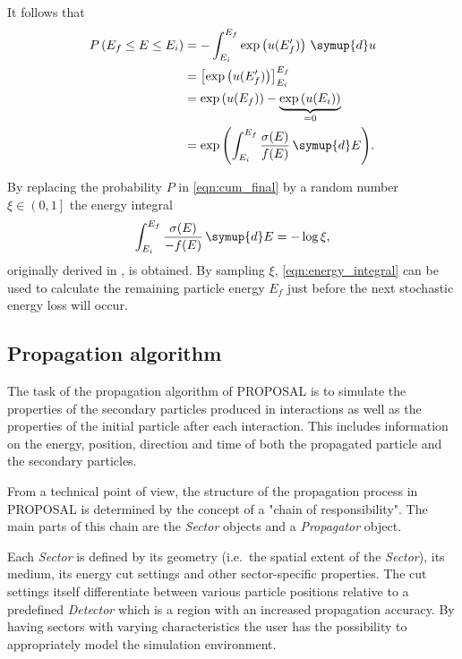 It follows that
%
\begin{equation}
	\label{eqn:cum_final}
	\begin{split}
	P\left(E_f \leq E \leq E_i\right) &= - \int_{E_i}^{E_f} \exp \left( u(E_f') \right) \, \symup{d}u \\
	&= \left[ \exp \left( u(E'_f) \right) \right]_{E_i}^{E_f}\\
	&= \exp\left( u(E_f) \right) - \underbrace{\exp \left( u(E_i) \right)}_{= 0} \\
	&= \exp{\left( \int_{E_i}^{E_f} \frac{\sigma(E)}{f(E)} \, \symup{d}E \right)}.
	\end{split}
\end{equation}

By replacing the probability $P$ in \eqref{eqn:cum_final} by a random number $\xi \in \left(0, 1\right]$ the energy integral
%
\begin{equation}
	\label{eqn:energy_integral}
	\int_{E_i}^{E_f} \frac{\sigma(E)}{-f(E)} \, \symup{d}E = - \log{\xi},
\end{equation}
%
originally derived in \cite{chirkin2004propagating}, is obtained. 
By sampling $\xi$, \eqref{eqn:energy_integral} can be used to calculate the remaining particle energy $E_f$ just before the next stochastic energy loss will occur.

\subsection{Propagation algorithm}
\label{sec:algorithm}

The task of the propagation algorithm of PROPOSAL is to simulate the properties of the secondary particles produced in interactions as well as the properties of the initial particle after each interaction.
This includes information on the energy, position, direction and time of both the propagated particle and the secondary particles.

From a technical point of view, the structure of the propagation process in PROPOSAL is determined by the concept of a "chain of responsibility".
The main parts of this chain are the \emph{Sector} objects and a \emph{Propagator} object.

Each \emph{Sector} is defined by its geometry (i.e.\ the spatial extent of the \emph{Sector}), its medium, its energy cut settings and other sector-specific properties.
The cut settings itself differentiate between various particle positions relative to a predefined \emph{Detector} which is a region with an increased propagation accuracy.
By having sectors with varying characteristics the user has the possibility to appropriately model the simulation environment.

